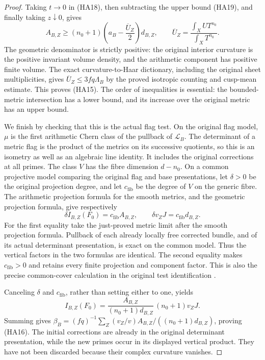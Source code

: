 \begin{proof}
Taking $t\to0$ in (HA18), then subtracting the upper bound (HA19),
and finally taking $z\downarrow0$, gives
\[
 A_{B,Z}\ge(n_0+1)
       \left(a_B-\frac{\overline U_Z}{2}\right)d_{B,Z},
 \qquad
 \overline U_Z=\frac{\int_XUT^{n_0}}{\int_XT^{n_0}}.
 \tag{HA20}
\]
The geometric denominator is strictly positive: the original
interior curvature is the positive invariant volume density,
and the arithmetic component has positive finite volume.
The exact curvature-to-Haar dictionary, including the original
sheet multiplicities, gives
$\overline U_Z\le3fq\Lambda_B$ by the proved isotropic counting
and cusp-mean estimate\cite{height-assembly-cusp-record}.
This proves (HA15).  The order of inequalities is essential:
the bounded-metric intersection has a lower bound, and its
increase over the original metric has an upper bound.

We finish by checking that this is the actual flag test.
On the original flag model, $\mu$ is the first arithmetic Chern
class of the pullback of $\mathcal L_B$.  The determinant of a
metric flag is the product of the metrics on its successive
quotients, so this is an isometry as well as an algebraic line
identity.  It includes the original corrections at all primes.
The class $V$ has the fibre dimension $d-n_0$.
On a common projective model comparing the original flag and base
presentations, let $\delta>0$ be the original projection degree,
and let $c_{\mathrm{fib}}$ be the degree of $V$ on the generic
fibre.  The arithmetic projection formula for the smooth metrics,
and the geometric projection formula, give respectively
\[
 \delta I_{B,Z}(F_0)=c_{\mathrm{fib}}A_{B,Z},\qquad
 \delta v_ZJ=c_{\mathrm{fib}}d_{B,Z}.
 \tag{HA21}
\]
For the first equality take the just-proved metric limit after
the smooth projection formula.  Pullback of each already locally
free corrected bundle, and of its actual determinant presentation,
is exact on the common model.  Thus the vertical factors in the
two formulas are identical.  The second equality makes
$c_{\mathrm{fib}}>0$ and retains every finite projection and
component factor.  This is also the precise common-cover
calculation in the original test identification
\cite{height-assembly-source}.

Canceling $\delta$ and $c_{\mathrm{fib}}$, rather than setting
either to one, yields
\[
 I_{B,Z}(F_0)=
       \frac{A_{B,Z}}{(n_0+1)d_{B,Z}}\,(n_0+1)v_ZJ.
\]
Summing gives
$\beta_B=(fq)^{-1}\sum_Z(v_Z/v)
A_{B,Z}/((n_0+1)d_{B,Z})$, proving (HA16).
The initial corrections are already in the original determinant
presentation, while the new primes occur in its displayed
vertical product.  They have not been discarded because their
complex curvature vanishes.
\end{proof}
